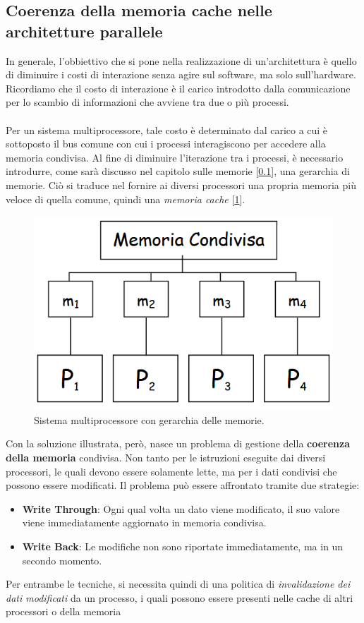 \subsection{Coerenza della memoria cache nelle architetture parallele}
In generale, l'obbiettivo che si pone nella realizzazione di un'architettura è quello di diminuire i costi di interazione senza agire sul software, ma solo sull'hardware. Ricordiamo che il costo di interazione è il carico introdotto dalla comunicazione per lo scambio di informazioni che avviene tra due o più processi.
\\
\\
Per un sistema multiprocessore, tale costo è determinato dal carico a cui è sottoposto il bus comune con cui i processi interagiscono per accedere alla memoria condivisa. Al fine di diminuire l'iterazione tra i processi, è necessario introdurre, come sarà discusso nel capitolo sulle memorie [\ref{}], una gerarchia di memorie. Ciò si traduce nel
fornire ai diversi processori una propria memoria più veloce di quella comune, quindi una \textit{memoria cache} [\ref{fig:mulproc-mem}].
\begin{figure}[!h]
    \centering
    \includegraphics[width=0.3\linewidth]{img/multiproc-gerarchia.png}
    \caption{Sistema multiprocessore con gerarchia delle memorie.}
    \label{fig:mulproc-mem}
\end{figure}
Con la soluzione illustrata, però, nasce un problema di gestione della \textbf{coerenza della memoria} condivisa. Non tanto per le istruzioni eseguite dai diversi processori, le quali devono essere solamente lette, ma per i dati condivisi che possono essere modificati.
Il problema può essere affrontato tramite due strategie:
\begin{itemize}
    \item \textbf{Write Through}: Ogni qual volta un dato viene modificato, il suo valore viene immediatamente aggiornato in memoria condivisa.
    \item \textbf{Write Back}: Le modifiche non sono riportate immediatamente, ma in un secondo momento.
\end{itemize}
Per entrambe le tecniche, si necessita quindi di una politica di \textit{invalidazione dei dati modificati} da
un processo, i quali possono essere presenti nelle cache di altri processori o della memoria
